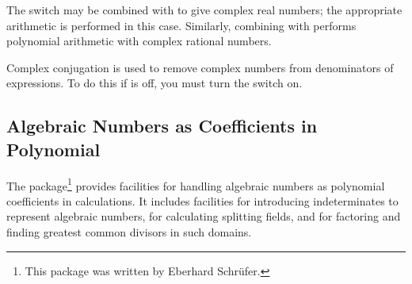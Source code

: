 The switch  may be combined with  to give complex
real numbers; the appropriate arithmetic is performed in this case.
Similarly, combining  with  performs polynomial
arithmetic with complex rational numbers.

\hypertarget{switch:RATIONALIZE}{}
Complex conjugation is used to remove complex numbers from denominators of
expressions.  To do this if  is off, you must turn the switch
 on.

\subsection{Algebraic Numbers as Coefficients in Polynomial}
\label{sec:package-arnum}

The  package\footnote{This package was written by Eberhard Schr\"ufer.}
provides facilities for handling algebraic numbers as
polynomial coefficients in {\REDUCE} calculations. It includes facilities for
introducing indeterminates to represent algebraic numbers, for calculating
splitting fields, and for factoring and finding greatest common divisors
in such domains.



\iffalse
\section{ROOT\_VAL Operator}
\hypertarget{operator:ROOT_VAL}{}

The \texttt{root\_val}\ttindex{root\_val}  operator takes a single univariate polynomial as
argument, and returns a list of root values at system precision (or
greater if required to separate roots).  It is used with the syntax
\begin{verbatim}
        root_val(exprn:univariate polynomial):list.
\end{verbatim}
For example, the sequence
\begin{verbatim}
        on rounded; root_val(x^3-x-1);
\end{verbatim}
gives the result
\begin{verbatim}
        {0.562279512062*i - 0.662358978622, - 0.562279512062*i

          - 0.662358978622,1.32471795724}
\end{verbatim}
\fi


